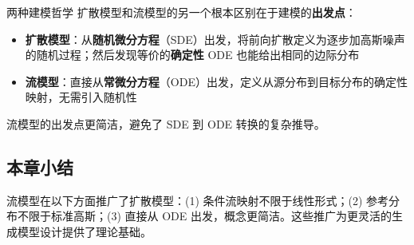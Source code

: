 \begin{knowledgebox}{两种建模哲学}
扩散模型和流模型的另一个根本区别在于建模的\textbf{出发点}：
\begin{itemize}
    \item \textbf{扩散模型}：从\textbf{随机微分方程}（SDE）出发，将前向扩散定义为逐步加高斯噪声的随机过程；然后发现等价的\textbf{确定性} ODE 也能给出相同的边际分布
    \item \textbf{流模型}：直接从\textbf{常微分方程}（ODE）出发，定义从源分布到目标分布的确定性映射，无需引入随机性
\end{itemize}
流模型的出发点更简洁，避免了 SDE 到 ODE 转换的复杂推导。
\end{knowledgebox}

\subsection{本章小结}

流模型在以下方面推广了扩散模型：(1) 条件流映射不限于线性形式；(2) 参考分布不限于标准高斯；(3) 直接从 ODE 出发，概念更简洁。这些推广为更灵活的生成模型设计提供了理论基础。

